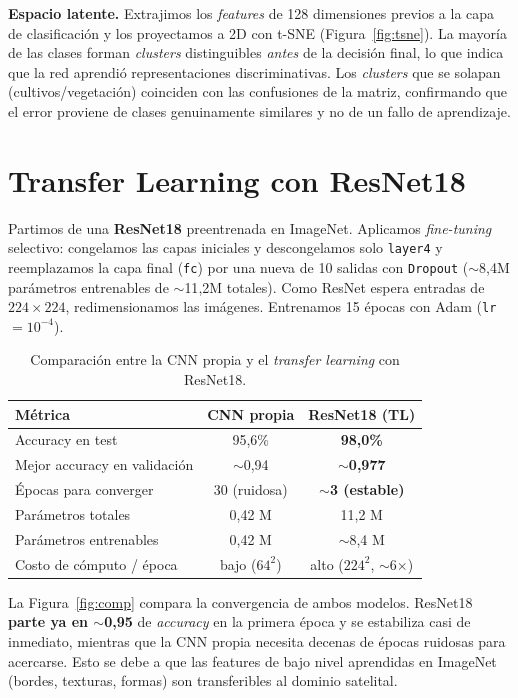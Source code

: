 \documentclass[11pt,a4paper]{article}
\begin{document}
\textbf{Espacio latente.} Extrajimos los \emph{features} de 128 dimensiones previos a la capa de
clasificaci\'on y los proyectamos a 2D con t-SNE (Figura~\ref{fig:tsne}). La mayor\'ia de las clases
forman \emph{clusters} distinguibles \emph{antes} de la decisi\'on final, lo que indica que la red
aprendi\'o representaciones discriminativas. Los \emph{clusters} que se solapan
(cultivos/vegetaci\'on) coinciden con las confusiones de la matriz, confirmando que el error proviene
de clases genuinamente similares y no de un fallo de aprendizaje.

\section{Transfer Learning con ResNet18}

Partimos de una \textbf{ResNet18} preentrenada en ImageNet. Aplicamos \emph{fine-tuning} selectivo:
congelamos las capas iniciales y descongelamos solo \texttt{layer4} y reemplazamos la capa final
(\texttt{fc}) por una nueva de 10 salidas con \texttt{Dropout} ($\sim$8{,}4M par\'ametros entrenables de
$\sim$11{,}2M totales). Como ResNet espera entradas de $224\times224$, redimensionamos las im\'agenes.
Entrenamos 15 \'epocas con Adam (\texttt{lr}$=10^{-4}$).

\begin{table}[H]
\centering
\small
\begin{tabular}{lcc}
\toprule
\textbf{M\'etrica} & \textbf{CNN propia} & \textbf{ResNet18 (TL)} \\
\midrule
Accuracy en test            & 95{,}6\%      & \textbf{98{,}0\%} \\
Mejor accuracy en validaci\'on & $\sim$0{,}94 & \textbf{$\sim$0{,}977} \\
\'Epocas para converger     & 30 (ruidosa)  & \textbf{$\sim$3 (estable)} \\
Par\'ametros totales        & 0{,}42 M      & 11{,}2 M \\
Par\'ametros entrenables    & 0{,}42 M      & $\sim$8{,}4 M \\
Costo de c\'omputo / \'epoca & bajo ($64^2$) & alto ($224^2$, $\sim$6$\times$) \\
\bottomrule
\end{tabular}
\caption{Comparaci\'on entre la CNN propia y el \emph{transfer learning} con ResNet18.}
\label{tab:comp}
\end{table}

La Figura~\ref{fig:comp} compara la convergencia de ambos modelos. ResNet18 \textbf{parte ya en
$\sim$0{,}95} de \emph{accuracy} en la primera \'epoca y se estabiliza casi de inmediato, mientras que
la CNN propia necesita decenas de \'epocas ruidosas para acercarse. Esto se debe a que las features de
bajo nivel aprendidas en ImageNet (bordes, texturas, formas) son transferibles al dominio satelital.
\end{document}
